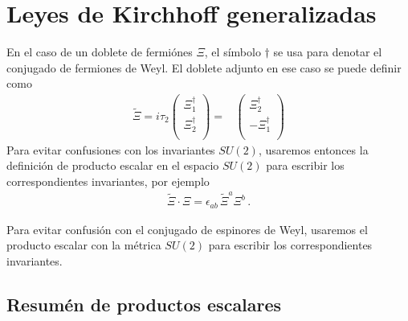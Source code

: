 \section{Leyes de Kirchhoff generalizadas}


En el caso de un doblete de fermiónes $\Xi$, el símbolo  $\dagger$ se usa para denotar el conjugado de fermiones de Weyl. El doblete adjunto en ese caso se puede definir como
\begin{align}
\label{eq:Xiadj}
 \widetilde{\Xi}=i\tau_2 \begin{pmatrix}
                  \Xi_1^{\dagger}\\
                  \Xi_2^{\dagger}\\
                \end{pmatrix}
=& \begin{pmatrix}
                  \Xi_2^{\dagger}\\
                 -\Xi_1^{\dagger}\\
                \end{pmatrix}
\end{align}
Para evitar confusiones con los invariantes $SU(2)$, usaremos entonces la definición de producto escalar en el espacio $SU(2)$ para escribir los correspondientes invariantes, por ejemplo
\begin{align}
  \widetilde{\Xi}\cdot \Xi=\epsilon_{ab}\,\widetilde{\Xi}^{a}\Xi^{b}\,.
\end{align}

Para evitar confusión con el conjugado de espinores de Weyl, usaremos el producto escalar con la métrica $SU(2)$ para escribir los correspondientes invariantes.


\subsection{Resumén de productos escalares}

